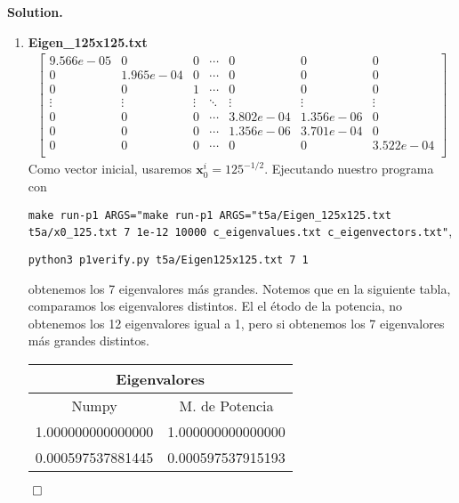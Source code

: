 \documentclass{article}
\theoremstyle{problemstyle}
\newenvironment{solution}{%
  \begin{mdframed}[linewidth=0.8pt,linecolor=Gray,backgroundcolor=Gray!5,roundcorner=5pt]%
  \noindent\textbf{Solution.}%
}{%
\hfill $ \qed $ 
  \end{mdframed}%
}
\begin{document}
\begin{solution}
\begin{enumerate}
		\item \textbf{Eigen\_125x125.txt}
		      \begin{align*}
			      \begin{bmatrix}
				      9.566e-05 & 0         & 0      & \cdots & 0         & 0         & 0         \\
				      0         & 1.965e-04 & 0      & \cdots & 0         & 0         & 0         \\
				      0         & 0         & 1      & \cdots & 0         & 0         & 0         \\
				      \vdots    & \vdots    & \vdots & \ddots & \vdots    & \vdots    & \vdots    \\
				      0         & 0         & 0      & \cdots & 3.802e-04 & 1.356e-06 & 0         \\
				      0         & 0         & 0      & \cdots & 1.356e-06 & 3.701e-04 & 0         \\
				      0         & 0         & 0      & \cdots & 0         & 0         & 3.522e-04 \\
			      \end{bmatrix}
		      \end{align*}
		      Como vector inicial, usaremos $ \mathbf{x}^i_0 = 125^{-1/2}$.
		      Ejecutando nuestro programa con
		      \begin{center}
			      \texttt{make run-p1
				      ARGS="make run-p1 ARGS="t5a/Eigen\_125x125.txt t5a/x0\_125.txt 7 1e-12 10000 c\_eigenvalues.txt c\_eigenvectors.txt"},
		      \end{center}
		      \begin{center}
			      \texttt{python3 p1\textunderscore verify.py t5a/Eigen\textunderscore125x125.txt 7 1}
		      \end{center}
		      obtenemos los 7 eigenvalores m\'as grandes. Notemos que en la siguiente tabla, comparamos los eigenvalores distintos. El el \'etodo de la potencia, no obtenemos los 12 eigenvalores igual a 1, pero si obtenemos los 7 eigenvalores m\'as grandes distintos.
		      \begin{table}[H]
			      \begin{center}
				      \begin{tabular}{|c|c|}
					      \multicolumn{2}{c}{Eigenvalores}   \\
					      \hline
					      Numpy             & M. de Potencia \\
					      \hline

					      1.000000000000000 &
					      1.000000000000000                  \\
					      \hline
					      0.000597537881445
					                        &
					      0.000597537915193
					      \\
					      \hline


\end{tabular}
\end{center}
\end{table}
\end{enumerate}
\end{solution}
\end{document}
